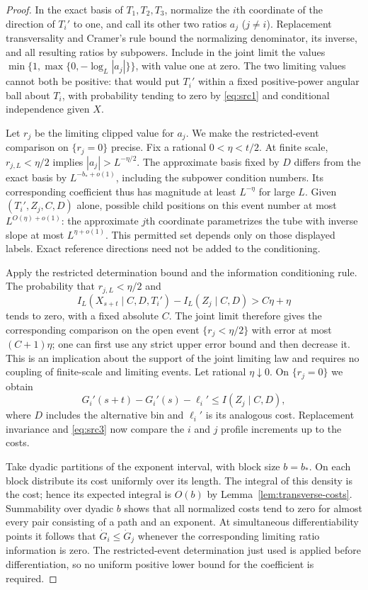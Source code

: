 \begin{proof}
In the exact basis of $T_1,T_2,T_3$, normalize the $i$th coordinate
of the direction of $T_i'$ to one, and call its other two ratios
$a_j$ ($j\ne i$).  Replacement transversality and Cramer's rule
bound the normalizing denominator, its inverse, and all resulting
ratios by subpowers.  Include in the joint limit the values
$\min\{1,\max\{0,-\log_L|a_j|\}\}$, with value one at zero.
The two limiting values cannot both be positive: that would put
$T_i'$ within a fixed positive-power angular ball about $T_i$,
with probability tending to zero by \eqref{eq:src1} and conditional
independence given $X$.

Let $r_j$ be the limiting clipped value for $a_j$.  We make the
restricted-event comparison on $\{r_j=0\}$ precise.  Fix a rational
$0<\eta<t/2$.  At finite scale, $r_{j,L}<\eta/2$ implies
$|a_j|>L^{-\eta/2}$.  The approximate basis fixed by $D$ differs
from the exact basis by $L^{-b_*+o(1)}$, including the subpower
condition numbers.  Its corresponding coefficient thus has
magnitude at least $L^{-\eta}$ for large $L$.  Given
$(T_i',Z_j,C,D)$ alone, possible child positions on this event
number at most $L^{O(\eta)+o(1)}$: the approximate $j$th coordinate
parametrizes the tube with inverse slope at most $L^{\eta+o(1)}$.
This permitted set depends only on those displayed labels.  Exact
reference directions need not be added to the conditioning.

Apply the restricted determination bound and the information
conditioning rule.  The probability that $r_{j,L}<\eta/2$ and
\[
 I_L(X_{s+t}\mid C,D,T_i')-I_L(Z_j\mid C,D)>C\eta+\eta
\]
tends to zero, with a fixed absolute $C$.  The joint limit therefore
gives the corresponding comparison on the open event
$\{r_j<\eta/2\}$ with error at most $(C+1)\eta$; one can first
use any strict upper error bound and then decrease it.  This is
an implication about the support of the joint limiting law and
requires no coupling of finite-scale and limiting events.  Let
rational $\eta\downarrow0$.  On $\{r_j=0\}$ we obtain
\[
 G_i'(s+t)-G_i'(s)-\ell_i'
       \le I(Z_j\mid C,D),
\]
where $D$ includes the alternative bin and $\ell_i'$ is its analogous
cost.  Replacement invariance and \eqref{eq:src3} now compare the
$i$ and $j$ profile increments up to the costs.

Take dyadic partitions of the exponent interval, with block size
$b=b_*$.  On each block distribute its cost uniformly over its
length.  The integral of this density is the cost; hence its expected
integral is $O(b)$ by Lemma~\ref{lem:transverse-costs}.  Summability
over dyadic $b$ shows that all normalized costs tend to zero for
almost every pair consisting of a path and an exponent.  At
simultaneous differentiability points it follows that
$\dot G_i\le\dot G_j$ whenever the corresponding limiting ratio
information is zero.  The restricted-event determination just used
is applied before differentiation, so no uniform positive lower
bound for the coefficient is required.


\end{proof}
